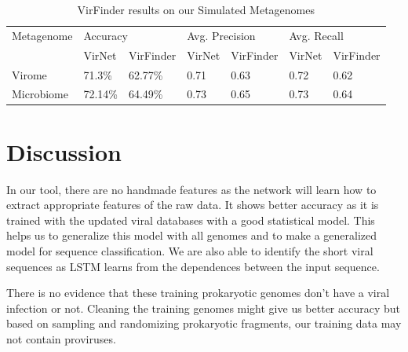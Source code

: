 \documentclass[conference]{IEEEtran}
\begin{document}
\begin{table}[!htbp]
	\centering
	\begin{tabular}{||l l l l l l l||} 
	Metagenome &	\multicolumn{2}{l}{Accuracy} & \multicolumn{2}{l}{Avg. Precision} & \multicolumn{2}{l}{Avg. Recall}\\ [0.5ex] 
	& VirNet & VirFinder & VirNet & VirFinder & VirNet & VirFinder \\
		\hline\hline
		Virome & 71.3\% &	62.77\%	& 0.71 & 0.63 & 0.72 & 0.62 \\
		Microbiome &	72.14\% & 64.49\% &	0.73 & 0.65 & 0.73 & 0.64 \\ [1ex]
	\end{tabular}
	\caption{VirFinder results on our Simulated Metagenomes}
	\label{table:virfinder_results_simulated}
\end{table}


\section{Discussion}

In our tool, there are no handmade features as the network will learn how to extract appropriate features of the raw data. It shows better accuracy as it is trained with the updated viral databases with a good statistical model. This helps us to generalize this model with all genomes and to make a generalized model for sequence classification. We are also able to identify the short viral sequences as LSTM learns from the dependences between the input sequence. 

There is no evidence that these training prokaryotic genomes don't have a viral infection or not. Cleaning the training genomes might give us better accuracy but based on sampling and randomizing prokaryotic fragments, our training data may not contain proviruses. 
\end{document}
